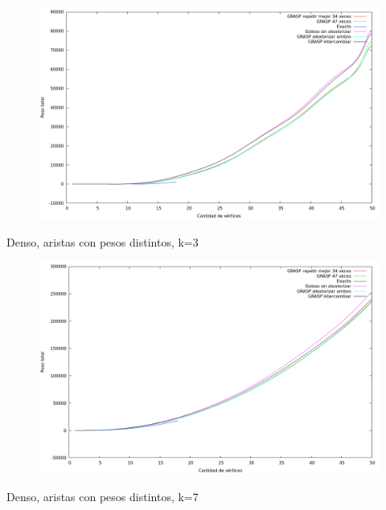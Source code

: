 \begin{figure}[H]
  \begin{center}
    \includegraphics[scale=0.35]{imagenes/ej6-denso-pesos-iguales-k7-peso.png}
  \end{center}
\end{figure}

Denso, aristas con pesos distintos, k=3

\begin{figure}[H]
  \begin{center}
    \includegraphics[scale=0.35]{imagenes/ej6-denso-pesos-distintos-k3-peso.png}
  \end{center}
\end{figure}

Denso, aristas con pesos distintos, k=7

